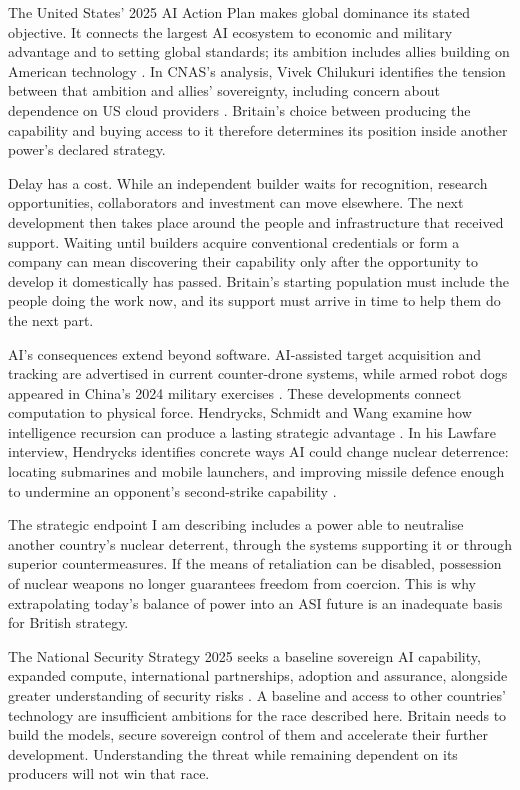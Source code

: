 The United States' 2025 AI Action Plan makes global dominance its stated
objective. It connects the largest AI ecosystem to economic and military
advantage and to setting global standards; its ambition includes allies
building on American technology \cite{usactionplan2025}. In CNAS's analysis,
Vivek Chilukuri identifies the tension between that ambition and allies'
sovereignty, including concern about dependence on US cloud providers
\cite{cnasactionplan2025}. Britain's choice between producing the capability
and buying access to it therefore determines its position inside another
power's declared strategy.

Delay has a cost. While an independent builder waits for recognition,
research opportunities, collaborators and investment can move elsewhere.
The next development then takes place around the people and infrastructure
that received support. Waiting until builders acquire conventional
credentials or form a company can mean discovering their capability only
after the opportunity to develop it domestically has passed. Britain's
starting population must include the people doing the work now, and its
support must arrive in time to help them do the next part.

AI's consequences extend beyond software. AI-assisted target acquisition
and tracking are advertised in current counter-drone systems, while armed
robot dogs appeared in China's 2024 military exercises
\cite{skyspotter2025,uscc2024}. These developments connect computation to
physical force. Hendrycks, Schmidt and Wang examine how intelligence
recursion can produce a lasting strategic advantage
\cite{hendrycks2025strategy}. In his Lawfare interview, Hendrycks identifies
concrete ways AI could change nuclear deterrence: locating submarines and
mobile launchers, and improving missile defence enough to undermine an
opponent's second-strike capability \cite{lawfarehendrycks2025}.

The strategic endpoint I am describing includes a power able to neutralise
another country's nuclear deterrent, through the systems supporting it or
through superior countermeasures. If the means of retaliation can be
disabled, possession of nuclear weapons no longer guarantees freedom from
coercion. This is why extrapolating today's balance of power into an ASI
future is an inadequate basis for British strategy.

The National Security Strategy 2025 seeks a baseline sovereign AI
capability, expanded compute, international partnerships, adoption and
assurance, alongside greater understanding of security risks
\cite{nss2025}. A baseline and access to other countries' technology are
insufficient ambitions for the race described here. Britain needs to build
the models, secure sovereign control of them and accelerate their further
development. Understanding the threat while remaining dependent on its
producers will not win that race.

